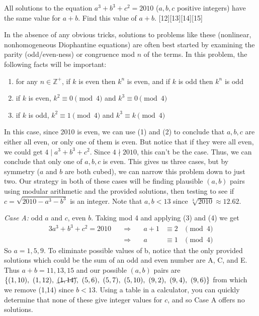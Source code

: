 \documentclass[12pt]{article}
\newcounter{problem}
\begin{document}
\begin{problem}
   All solutions to the equation \( a^3 + b^3 + c^2 = 2010 \) (\( a, b, c \) positive integers) have the same value for \( a + b \). Find this value of \( a + b \).
   [12][13][14][15]
\end{problem}

\begin{solution}
   In the absence of any obvious tricks, solutions to problems like these (nonlinear, nonhomogeneous Diophantine equations) are often best started by examining the parity (odd/even-ness) or congruence mod $n$ of the terms. In this problem, the following facts will be important:
    \begin{enumerate}[topsep=2mm, label=(\arabic*)]
        \item for any $n\in\mathbb{Z}^+$, if $k$ is even then $k^n$ is even, and if $k$ is odd then $k^n$ is odd 
        \item if $k$ is even, $k^2 \equiv 0 \pmod{4}$ and $k^3 \equiv 0 \pmod{4}$
        \item if $k$ is odd, $k^2 \equiv 1 \pmod{4}$ and $k^3 \equiv k \pmod{4}$
    \end{enumerate}
    In this case, since 2010 is even, we can use (1) and (2) to conclude that $a,b,c$ are either all even, or only one of them is even. But notice that if they were all even, we could get $4 \mid a^3 + b^3 + c^2$. Since $4 \nmid 2010$, this can't be the case. Thus, we can conclude that only one of $a,b,c$ is even. This gives us three cases, but by symmetry ($a$ and $b$ are both cubed), we can narrow this problem down to just two. Our strategy in both of these cases will be finding plausible $(a,b)$ pairs using modular arithmetic and the provided solutions, then testing to see if $c=\sqrt{2010-a^3-b^3}$ is an integer. Note that $a,b < 13$ since $\sqrt[3]{2010}\approx12.62$.
    
    \emph{Case A:} odd $a$ and $c$, even $b$. Taking mod 4 and applying (3) and (4) we get
    \begin{alignat*}{3}
        a^3 + b^3 + c^2 = 2010 \quad &\Rightarrow& \quad a + 1 &\equiv 2 &\pmod 4\\
        &\Rightarrow& \quad a &\equiv 1 &\pmod 4
    \end{alignat*}
    So $a=1,5,9$. To eliminate possible values of b, notice that the only provided solutions which could be the sum of an odd and even number are A, C, and E. Thus $a+b=11,13,15$ and our possible $(a,b)$ pairs are $\{(1,10),\ (1, 12),\ \cancel{(1,14)},\ (5,6),\ (5,7),\ (5,10),\ (9,2),\ (9,4),\ (9,6)\}$ from which we remove (1,14) since $b<13$. Using a table in a calculator, you can quickly determine that none of these give integer values for $c$, and so Case A offers no solutions.
    

\end{solution}
\end{document}
